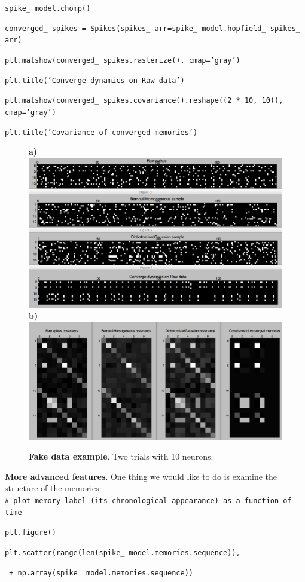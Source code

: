 \documentclass[letter, 12pt]{article}
\theoremstyle{definition}
\theoremstyle{remark}
\begin{document}
\texttt{spike\_\,model.chomp()}

\texttt{converged\_\,spikes = Spikes(spikes\_\,arr=spike\_\,model.hopfield\_\,spikes\_\,arr)}

\texttt{plt.matshow(converged\_\,spikes.rasterize(), cmap='gray')}

\texttt{plt.title('Converge dynamics on Raw data')}

\texttt{plt.matshow(converged\_\,spikes.covariance().reshape((2 * 10, 10)), cmap='gray')}

\texttt{plt.title('Covariance of converged memories')} 	\\

 


\begin{figure}
\begin{center}
\textbf{a)}\includegraphics[width=.41\linewidth]{demo_fake_spikes.png} 
\textbf{b)}\includegraphics[width=.53\linewidth]{cov_demo.png} 
\caption{\textbf{Fake data example}. Two trials with 10 neurons.}
\label{fake_ex_fig}
\vspace{-.8cm}
\end{center}
\end{figure}



\textbf{More advanced features}.  One thing we would like to do is examine the structure of the memories: \\

\texttt{\# plot memory label (its chronological appearance) as a function of time}

\texttt{plt.figure()}

\texttt{plt.scatter(range(len(spike\_\,model.memories.sequence)),}

\texttt{\quad \quad {} + np.array(spike\_\,model.memories.sequence))}
\end{document}
